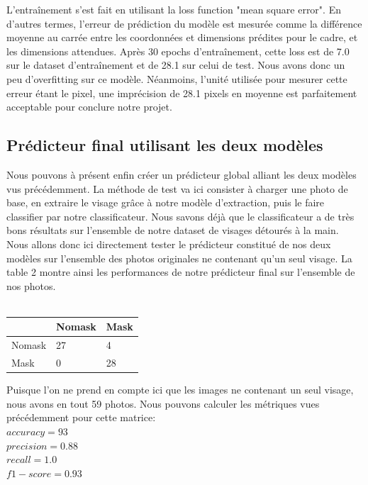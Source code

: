 \documentclass{article}
\begin{document}
L'entraînement s'est fait en utilisant la loss function "mean square error". En d'autres termes, l'erreur de prédiction du modèle est mesurée comme la différence moyenne au carrée entre les coordonnées et dimensions prédites pour le cadre, et les dimensions attendues. Après 30 epochs d'entraînement, cette loss est de 7.0 sur le dataset d'entraînement et de 28.1 sur celui de test. Nous avons donc un peu d'overfitting sur ce modèle. Néanmoins, l'unité utilisée pour mesurer cette erreur étant le pixel, une imprécision de 28.1 pixels en moyenne est parfaitement acceptable pour conclure notre projet.

\subsection{Prédicteur final utilisant les deux modèles}
Nous pouvons à présent enfin créer un prédicteur global alliant les deux modèles vus précédemment. La méthode de test va ici consister à charger une photo de base, en extraire le visage grâce à notre modèle d'extraction, puis le faire classifier par notre classificateur. Nous savons déjà que le classificateur a de très bons résultats sur l'ensemble de notre dataset de visages détourés à la main. Nous allons donc ici directement tester le prédicteur constitué de nos deux modèles sur l'ensemble des photos originales ne contenant qu'un seul visage. La table 2 montre ainsi les performances de notre prédicteur final sur l'ensemble de nos photos.\\\\
\begin{tabular}{ |p{2cm}||p{2cm}|p{2cm}| }
 \hline
   & Nomask & Mask \\
 \hline
  Nomask & 27 & 4 \\
 Mask & 0 & 28 \\
 \hline
\end{tabular}
Puisque l'on ne prend en compte ici que les images ne contenant un seul visage, nous avons en tout 59 photos. Nous pouvons calculer les métriques vues précédemment pour cette matrice:\\
$accuracy = 93$ \\   $precision = 0.88$ \\   $recall = 1.0$ \\   $f1-score = 0.93$\\
\end{document}
